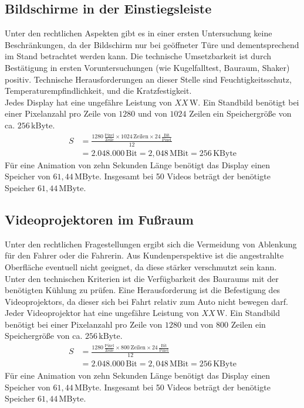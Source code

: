 \subsection{Bildschirme in der Einstiegsleiste}
Unter den rechtlichen Aspekten gibt es in einer ersten Untersuchung keine Beschränkungen, da der Bildschirm nur bei geöffneter Türe und dementsprechend im Stand betrachtet werden kann.
Die technische Umsetzbarkeit ist durch Bestätigung in ersten Voruntersuchungen (wie Kugelfalltest, Bauraum, Shaker) positiv.
Technische Herausforderungen an dieser Stelle sind Feuchtigkeitsschutz, Temperaturempfindlichkeit, und die Kratzfestigkeit. \\
Jedes Display hat eine ungefähre Leistung von $ XX\,\mathrm{W} $. 
Ein Standbild benötigt bei einer Pixelanzahl pro Zeile von $ 1280 $ und von $ 1024 $ Zeilen ein Speichergröße von ca. $ 256\,\mathrm{kByte}$. 
\begin{align}
	S &= \frac{1280\,\frac{\mathrm{Pixel}}{\mathrm{Zeile}}\times 1024\,\mathrm{Zeilen} \times 24\,\frac{\mathrm{Bit}}{\mathrm{Pixel}}}{12} \\
	&= 2.048.000\,\mathrm{Bit} = 2,048\,\mathrm{MBit} = 256\,\mathrm{KByte}
\end{align}
Für eine Animation von zehn Sekunden Länge benötigt das Display einen Speicher von $ 61,44\,\mathrm{MByte}$.
Insgesamt bei 50 Videos beträgt der benötigte Speicher $ 61,44\,\mathrm{MByte}$.
\subsection{Videoprojektoren im Fußraum}
Unter den rechtlichen Fragestellungen ergibt sich die Vermeidung von Ablenkung für den Fahrer oder die Fahrerin.
Aus Kundenperspektive ist die angestrahlte Oberfläche eventuell nicht geeignet, da diese stärker verschmutzt sein kann. \\
Unter den technischen Kriterien ist die Verfügbarkeit des Bauraums mit der benötigten Kühlung zu prüfen. Eine Herausforderung ist die Befestigung des Videoprojektors, da dieser sich bei Fahrt relativ zum Auto nicht bewegen darf.
Jeder Videoprojektor hat eine ungefähre Leistung von $ XX\,\mathrm{W} $. 
Ein Standbild benötigt bei einer Pixelanzahl pro Zeile von $ 1280 $ und von $ 800 $ Zeilen ein Speichergröße von ca. $ 256\,\mathrm{kByte}$. 
\begin{align}
	S &= \frac{1280\,\frac{\mathrm{Pixel}}{\mathrm{Zeile}}\times 800\,\mathrm{Zeilen} \times 24\,\frac{\mathrm{Bit}}{\mathrm{Pixel}}}{12} \\
	&= 2.048.000\,\mathrm{Bit} = 2,048\,\mathrm{MBit} = 256\,\mathrm{KByte}
\end{align}
Für eine Animation von zehn Sekunden Länge benötigt das Display einen Speicher von $ 61,44\,\mathrm{MByte}$.
Insgesamt bei 50 Videos beträgt der benötigte Speicher $ 61,44\,\mathrm{MByte}$.
